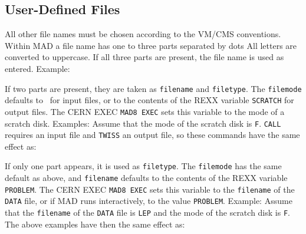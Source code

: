\subsection{User-Defined Files}
All other file names must be chosen according to the VM/CMS conventions.
Within MAD a file name has one to three parts separated by dots
All letters are converted to uppercase.
If all three parts are present, the file name is used as entered.
Example:
\par If two parts are present,
they are taken as {\tt filename} and {\tt filetype}.
The {\tt filemode} defaults to~{\tt *} for input files,
or to the contents of the REXX variable {\tt SCRATCH}
for output files.
The CERN EXEC {\tt MAD8 EXEC} sets this variable to the mode of
a scratch disk.
Examples:
Assume that the mode of the scratch disk is {\tt F}.
{\tt CALL} requires an input file and {\tt TWISS} an output file,
so these commands have the same effect as:
\par If only one part appears, it is used as {\tt filetype}.
The {\tt filemode} has the same default as above, and {\tt filename}
defaults to the contents of the REXX variable {\tt PROBLEM}.
The CERN EXEC {\tt MAD8 EXEC} sets this variable to the {\tt filename}
of the {\tt DATA} file, or if MAD runs interactively,
to the value {\tt PROBLEM}.
Example:
Assume that the {\tt filename} of the {\tt DATA} file is {\tt LEP}
and the mode of the scratch disk is {\tt F}.
The above examples have then the same effect as:
 
